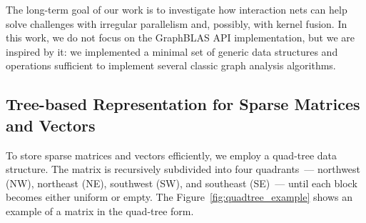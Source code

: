 The long-term goal of our work is to investigate how interaction nets can help solve challenges with irregular parallelism and, possibly, with kernel fusion.
In this work, we do not focus on the GraphBLAS API implementation, but we are inspired by it: we implemented a minimal set of generic data structures and operations sufficient to implement several classic graph analysis algorithms.
 

\subsection{Tree-based Representation for Sparse Matrices and Vectors}

To store sparse matrices and vectors efficiently, we employ a quad-tree data structure. The matrix is recursively subdivided into four quadrants~--- northwest (NW), northeast (NE), southwest (SW), and southeast (SE)~--- until each block becomes either uniform or empty.
The Figure~\ref{fig:quadtree_example} shows an example of a matrix in the quad-tree form.

